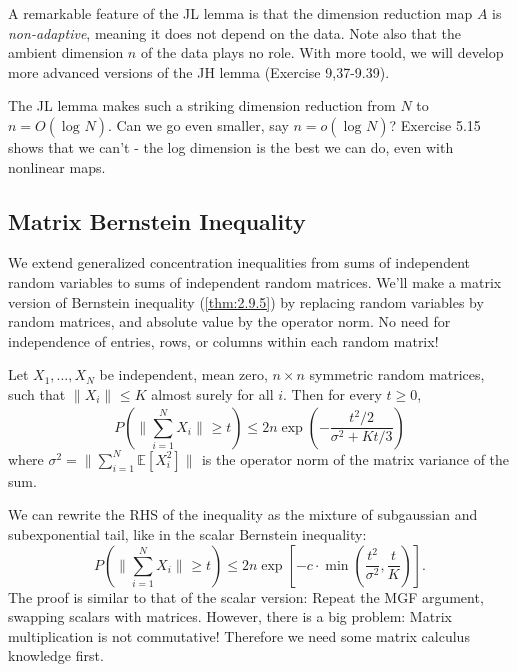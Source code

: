 \begin{remark}
\label{rmk:5.3.3}
A remarkable feature of the JL lemma is that the dimension reduction map $A$ is \textit{non-adaptive}, 
meaning it does not depend on the data. Note also that the ambient dimension $n$ of the data plays no role. With 
more toold, we will develop more advanced versions of the JH lemma (Exercise 9,37-9.39).
\end{remark}

\begin{remark}[Optimality]
The JL lemma makes such a striking dimension reduction from $N$ to $n = O(\log_{}{N})$. Can we go even smaller, 
say $n = o(\log_{}{N})$? Exercise 5.15 shows that we can't - the log dimension is the best we can do, even with 
nonlinear maps.
\end{remark}



\subsection{Matrix Bernstein Inequality}
We extend generalized concentration inequalities from sums of independent random variables to sums of 
independent random matrices. We'll make a matrix version of Bernstein inequality (\cref{thm:2.9.5}) by 
replacing random variables by random matrices, and absolute value by the operator norm. No need for 
independence of entries, rows, or columns within each random matrix!

\begin{theorem}
\label{thm:5.4.1}
Let $X_1, \dots, X_N$ be independent, mean zero, $n \times n$ symmetric random matrices, such that 
$\lVert X_i \rVert_{} \leq K$ almost surely for all $i$. Then for every $t \geq 0$, 
\[ P \left( \lVert \sum_{i = 1}^{N}X_i \rVert_{} \geq t \right) \leq 
2n \exp{\left( -\frac{t^2 / 2}{\sigma^2 + Kt / 3} \right)} \]
where $\sigma^2 = \lVert \sum_{i = 1}^{N} \mathbb{E}[X_i^2] \rVert_{}$ is the operator norm of the matrix 
variance of the sum.
\end{theorem}
We can rewrite the RHS of the inequality as the mixture of subgaussian and subexponential tail, like in the 
scalar Bernstein inequality:
\[ P \left( \lVert \sum_{i = 1}^{N}X_i \rVert_{} \geq t \right) \leq 
2n \exp{\left[ -c \cdot \min_{}\left( \frac{t^2}{\sigma^2}, \frac{t}{K} \right) \right]}. \]
The proof is similar to that of the scalar version: Repeat the MGF argument, swapping scalars with matrices. 
However, there is a big problem: Matrix multiplication is not commutative! Therefore we need some matrix 
calculus knowledge first.


